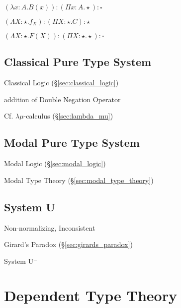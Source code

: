 $(\lambda x:A.B(x)):(\Pi x:A.\star):\square$

$(\Lambda X:\star.f_X):(\Pi X:\star.C):\star$

$(\Lambda X:\star.F(X)):(\Pi X:\star.\star):\square$



\subsection{Classical Pure Type System}\label{sec:cpts}

Classical Logic (\S\ref{sec:classical_logic})

addition of Double Negation Operator

\fist Cf. $\lambda\mu$-calculus (\S\ref{sec:lambda_mu})



\subsection{Modal Pure Type System}\label{sec:mpts}

Modal Logic (\S\ref{sec:modal_logic})

Modal Type Theory (\S\ref{sec:modal_type_theory})



\subsection{System U}\label{sec:system_u}

Non-normalizing, Inconsistent

Girard's Paradox (\S\ref{sec:girards_paradox})

System U$^-$



\section{Dependent Type Theory}\label{sec:dependent_type_theory}

